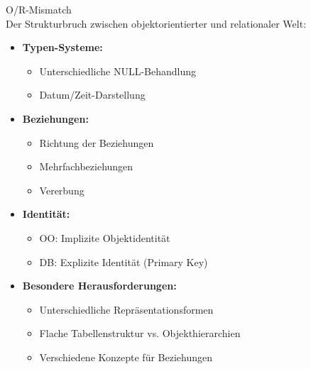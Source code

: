 \begin{definition}{O/R-Mismatch}\\
Der Strukturbruch zwischen objektorientierter und relationaler Welt:
\begin{itemize}
    \item \textbf{Typen-Systeme:}
    \begin{itemize}
        \item Unterschiedliche NULL-Behandlung
        \item Datum/Zeit-Darstellung
    \end{itemize}
    \item \textbf{Beziehungen:}
    \begin{itemize}
        \item Richtung der Beziehungen
        \item Mehrfachbeziehungen
        \item Vererbung
    \end{itemize}
    \item \textbf{Identität:}
    \begin{itemize}
        \item OO: Implizite Objektidentität
        \item DB: Explizite Identität (Primary Key)
    \end{itemize}
    \item \textbf{Besondere Herausforderungen:}
    \begin{itemize}
        \item Unterschiedliche Repräsentationsformen
        \item Flache Tabellenstruktur vs. Objekthierarchien
        \item Verschiedene Konzepte für Beziehungen
    \end{itemize}
\end{itemize}
\end{definition}



